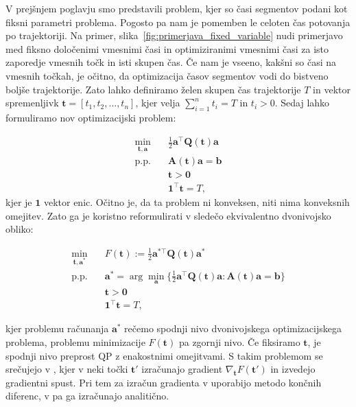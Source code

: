 \documentclass[mat2, tisk]{fmfdelo}
\begin{document}
V prejšnjem poglavju smo predstavili problem, kjer so časi segmentov podani kot fiksni parametri problema. Pogosto pa nam je pomemben le celoten čas potovanja po trajektoriji. Na primer, slika~\ref{fig:primerjava_fixed_variable} nudi primerjavo med fiksno določenimi vmesnimi časi in optimiziranimi vmesnimi časi za isto zaporedje vmesnih točk in isti skupen čas. Če nam je vseeno, kakšni so časi na vmesnih točkah, je očitno, da optimizacija časov segmentov vodi do bistveno boljše trajektorije. Zato lahko definiramo želen skupen čas trajektorije $T$ in vektor spremenljivk $\mathbf{t} = \left[ t_1, t_2, \ldots , t_n\right]$, kjer velja $\sum_{i=1}^n t_i = T$ in $t_i > 0$.  Sedaj lahko formuliramo nov optimizacijski problem:

\begin{equation}
    \begin{aligned}
        \min_{\mathbf{t},\mathbf{a}} & \quad \frac{1}{2}\mathbf{a}^\top \mathbf{Q}(\mathbf{t}) \mathbf{a}\\
        \text{p.p.} & \quad \mathbf{A}(\mathbf{t})\mathbf{a} = \mathbf{b}\\
        & \quad \mathbf{t} > \mathbf{0} \\
        & \quad \mathbf{1}^\top \mathbf{t} = T,
    \end{aligned}
\end{equation}
kjer je $\mathbf{1}$ vektor enic. Očitno je, da ta problem ni konveksen, niti nima konveksnih omejitev. Zato ga je koristno reformulirati v sledečo ekvivalentno dvonivojsko obliko:

\begin{equation}
    \label{eq:bilevel}
    \begin{aligned}
        \min_{\mathbf{t},\mathbf{a^*}}& \quad F(\mathbf{t}) := \frac{1}{2}\mathbf{a^{*\top}}\mathbf{Q}(\mathbf{t})\mathbf{a^*} \\
        \text{p.p.}& \quad\mathbf{a^*} = \arg \min_\mathbf{a} \{\frac{1}{2}\mathbf{a}^\top\mathbf{Q}(\mathbf{t})\mathbf{a} : \mathbf{A}(\mathbf{t})\mathbf{a} = \mathbf{b}\}\\
        & \quad \mathbf{t} > \mathbf{0} \\
        & \quad \mathbf{1}^\top \mathbf{t} = T,
    \end{aligned}
\end{equation}

kjer problemu računanja $\mathbf{a}^*$ rečemo spodnji nivo dvonivojskega optimizacijskega problema, problemu minimizacije $F(\mathbf{t})$ pa zgornji nivo. Če fiksiramo $\mathbf{t}$, je spodnji nivo preprost QP z enakostnimi omejitvami. S takim problemom se srečujejo v \cite{mellinger2011minimum, sun2021fast}, kjer v neki točki $\mathbf{t}'$ izračunajo gradient $\nabla_\mathbf{t}F(\mathbf{t}')$ in izvedejo gradientni spust. Pri tem za izračun gradienta v \cite{mellinger2011minimum} uporabijo metodo končnih diferenc, v \cite{sun2021fast} pa ga izračunajo analitično.
\end{document}
